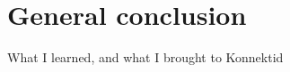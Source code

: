 \section{General conclusion}
\label{sec:conclusion}

What I learned, and what I brought to Konnektid
